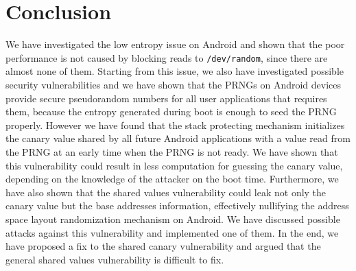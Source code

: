 \section{Conclusion}

We have investigated the low entropy issue on Android and shown that the poor performance is not caused by blocking reads to \verb|/dev/random|, since there are almost none of them. Starting from this issue, we also have investigated possible security vulnerabilities and we have shown that the PRNGs on Android devices provide secure pseudorandom numbers for all user applications that requires them, because the entropy generated during boot is enough to seed the PRNG properly. However we have found that the stack protecting mechanism initializes the canary value shared by all future Android applications with a value read from the PRNG at an early time when the PRNG is not ready. We have shown that this vulnerability could result in less computation for guessing the canary value, depending on the knowledge of the attacker on the boot time. Furthermore, we have also shown that the shared values vulnerability could leak not only the canary value but the base addresses information, effectively nullifying the address space layout randomization mechanism on Android. We have discussed possible attacks against this vulnerability and implemented one of them. In the end, we have proposed a fix to the shared canary vulnerability and argued that the general shared values vulnerability is difficult to fix.

